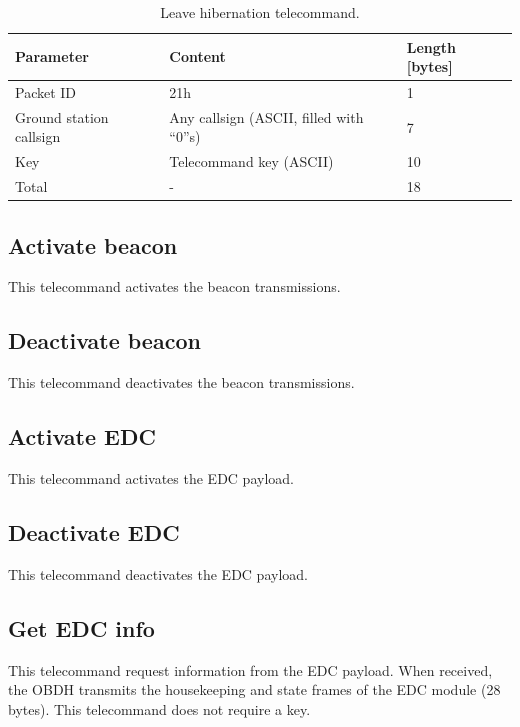 \begin{table}[!ht]
    \centering
    \begin{tabular}{lll}
        \toprule[1.5pt]
        \textbf{Parameter}      & \textbf{Content}                         & \textbf{Length [bytes]} \\
        \midrule
        Packet ID               & 21h                                      & 1 \\
        Ground station callsign & Any callsign (ASCII, filled with ``0''s) & 7 \\
        Key                     & Telecommand key (ASCII)                  & 10 \\
        \midrule
        Total                   & -                                        & 18 \\
        \bottomrule[1.5pt]
    \end{tabular}
    \caption{Leave hibernation telecommand.}
    \label{tab:leave-hibernation-tc}
\end{table}

\subsection{Activate beacon}

This telecommand activates the beacon transmissions.

\subsection{Deactivate beacon}

This telecommand deactivates the beacon transmissions.

\subsection{Activate EDC}

This telecommand activates the EDC payload.

\subsection{Deactivate EDC}

This telecommand deactivates the EDC payload.

\subsection{Get EDC info}

This telecommand request information from the EDC payload. When received, the OBDH transmits the housekeeping and state frames of the EDC module (28 bytes). This telecommand does not require a key.

